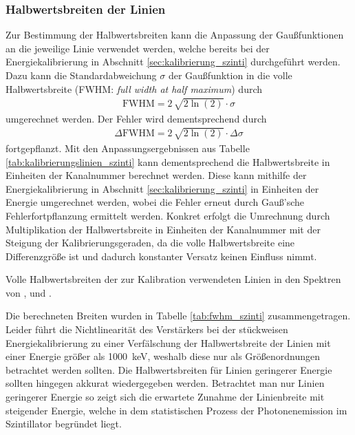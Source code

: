 \documentclass[11pt, a4paper]{article}
\numberwithin{equation}{section}
\begin{document}
\subsubsection{Halbwertsbreiten der Linien}
Zur Bestimmung der Halbwertsbreiten kann die Anpassung der Gaußfunktionen an die jeweilige Linie verwendet werden, welche bereits bei der Energiekalibrierung in Abschnitt \ref{sec:kalibrierung_szinti} durchgeführt werden.
Dazu kann die Standardabweichung $\sigma$ der Gaußfunktion in die volle Halbwertsbreite (FWHM: \textit{full width at half maximum}) durch
\begin{align}
	\text{FWHM} = 2 \, \sqrt{2\ln(2)} \cdot \sigma
\end{align}
umgerechnet werden.
Der Fehler wird dementsprechend durch
\begin{align}
	\Delta \text{FWHM} = 2 \, \sqrt{2\ln(2)} \cdot \Delta \sigma
\end{align}
fortgepflanzt.
Mit den Anpassungsergebnissen aus Tabelle \ref{tab:kalibrierungslinien_szinti} kann dementsprechend die Halbwertsbreite in Einheiten der Kanalnummer berechnet werden.
Diese kann mithilfe der Energiekalibrierung in Abschnitt \ref{sec:kalibrierung_szinti} in Einheiten der Energie umgerechnet werden, wobei die Fehler erneut durch Gauß'sche Fehlerfortpflanzung ermittelt werden.
Konkret erfolgt die Umrechnung durch Multiplikation der Halbwertsbreite in Einheiten der Kanalnummer mit der Steigung der Kalibrierungsgeraden, da die volle Halbwertsbreite eine Differenzgröße ist und dadurch konstanter Versatz keinen Einfluss nimmt.
\begin{table}[ht]
	\centering
	
	\caption{Volle Halbwertsbreiten der zur Kalibration verwendeten Linien in den Spektren von ,  und .}
	\label{tab:fwhm_szinti}
\end{table}
Die berechneten Breiten wurden in Tabelle \ref{tab:fwhm_szinti} zusammengetragen.
Leider führt die Nichtlinearität des Verstärkers bei der stückweisen Energiekalibrierung zu einer Verfälschung der Halbwertsbreite der Linien mit einer Energie größer als \SI{1000}{\kilo\electronvolt}, weshalb diese nur als Größenordnungen betrachtet werden sollten.
Die Halbwertsbreiten für Linien geringerer Energie sollten hingegen akkurat wiedergegeben werden.
Betrachtet man nur Linien geringerer Energie so zeigt sich die erwartete Zunahme der Linienbreite mit steigender Energie, welche in dem statistischen Prozess der Photonenemission im Szintillator begründet liegt.
\end{document}

